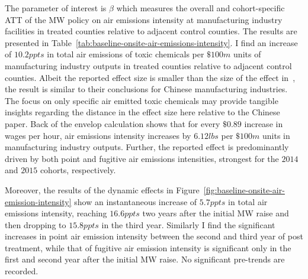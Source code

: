 \documentclass[12pt, english]{article}
\begin{document}
    The parameter of interest is $\beta$ which measures the overall and cohort-specific ATT of the MW policy on air emissions intensity at manufacturing industry facilities in treated counties relative to adjacent control counties. The results are presented in Table~\ref{tab:baseline-onsite-air-emissions-intensity}. I find an increase of $10.2ppts$ in total air emissions of toxic chemicals per $\$100m$ units of manufacturing industry outputs in treated counties relative to adjacent control counties. Albeit the reported effect size is smaller than the size of the effect in~\cite{zhang2023unintended}, the result is similar to their conclusions for Chinese manufacturing industries. The focus on only specific air emitted toxic chemicals may provide tangible insights regarding the distance in the effect size here relative to the Chinese paper. Back of the envelop calculation shows that for every $\$0.89$ increase in wages per hour, air emissions intensity increases by $6.12lbs$ per $\$100m$ units in manufacturing industry outputs. Further, the reported effect is predominantly driven by both point and fugitive air emissions intensities, strongest for the $2014$ and $2015$ cohorts, respectively.

    Moreover, the results of the dynamic effects in Figure~\ref{fig:baseline-onsite-air-emission-intensity} show an instantaneous increase of $5.7ppts$ in total air emissions intensity, reaching $16.6ppts$ two years after the initial MW raise and then dropping to $15.8ppts$ in the third year. Similarly I find the significant increases in point air emission intensity between the second and third year of post treatment, while that of fugitive air emission intensity is significant only in the first and second year after the initial MW raise. No significant pre-trends are recorded.
    
\end{document}
